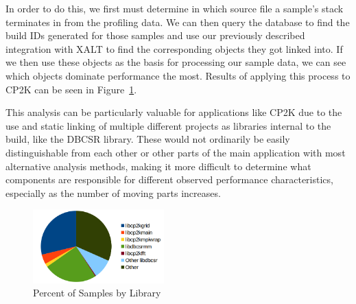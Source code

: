 In order to do this, we first must determine in which source file a sample's stack terminates in from the profiling data.
We can then query the database to find the build IDs generated for those samples and use our previously described integration with XALT to find the corresponding objects they got linked into.
If we then use these objects as the basis for processing our sample data, we can see which objects dominate performance the most.
Results of applying this process to CP2K can be seen in Figure~\ref{fig:library-performance}.

This analysis can be particularly valuable for applications like CP2K due to the use and static linking of multiple different projects as libraries internal to the build, like the \ac{DBCSR} library.
These would not ordinarily be easily distinguishable from each other or other parts of the main application with most alternative analysis methods, making it more difficult to determine what components are responsible for different observed performance characteristics, especially as the number of moving parts increases.

\begin{figure}
\begin{center}
\includegraphics[width=0.45\textwidth]{images/library-performance.png}
\end{center}
\caption{Percent of Samples by Library}
\label{fig:library-performance}
\end{figure}
